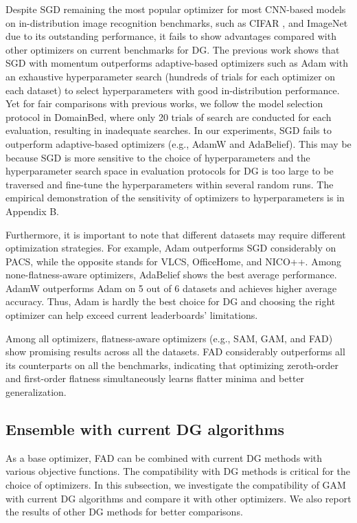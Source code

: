Despite SGD remaining the most popular optimizer for most CNN-based models on in-distribution image recognition benchmarks, such as CIFAR \cite{krizhevsky2009learning}, and ImageNet due to its outstanding performance, it fails to show advantages compared with other optimizers on current benchmarks for DG. 
The previous work \cite{naganuma2022empirical} shows that SGD with momentum outperforms adaptive-based optimizers such as Adam with  an exhaustive hyperparameter search (hundreds of trials for each optimizer on each dataset) to select hyperparameters with good in-distribution performance. Yet for fair comparisons with previous works, we follow the model selection protocol in DomainBed, where only 20 trials of search are conducted for each evaluation, resulting in inadequate searches. In our experiments, SGD fails to outperform adaptive-based optimizers (e.g., AdamW and AdaBelief). This may be because SGD is more sensitive to the choice of hyperparameters \cite{kingma2014adam} and the hyperparameter search space in evaluation protocols for DG is too large to be traversed and fine-tune the hyperparameters within several random runs. The empirical demonstration of the sensitivity of optimizers to hyperparameters is in Appendix B.

Furthermore, it is important to note that different datasets may require different optimization strategies. For example, Adam outperforms SGD considerably on PACS, while the opposite stands for VLCS, OfficeHome, and NICO++. Among none-flatness-aware optimizers, AdaBelief shows the best average performance. AdamW outperforms Adam on 5 out of 6 datasets and achieves higher average accuracy. Thus, Adam is hardly the best choice for DG and choosing the right optimizer can help exceed current leaderboards' limitations.    

Among all optimizers, flatness-aware optimizers (e.g., SAM, GAM, and FAD) show promising results across all the datasets. FAD considerably outperforms all its counterparts on all the benchmarks, indicating that optimizing zeroth-order and first-order flatness simultaneously learns flatter minima and better generalization. 





\subsection{Ensemble with current DG algorithms}
As a base optimizer, FAD can be combined with current DG methods with various objective functions. The compatibility with DG methods is critical for the choice of optimizers.
In this subsection, we investigate the compatibility of GAM with current DG algorithms and compare it with other optimizers. We also report the results of other DG methods for better comparisons.


